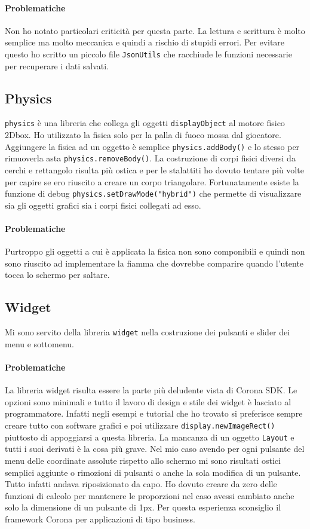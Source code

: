 		\paragraph{Problematiche}
			Non ho notato particolari criticità per questa parte. La lettura e scrittura è molto semplice ma molto meccanica e quindi a rischio di stupidi errori. Per evitare questo ho scritto un piccolo file \verb|JsonUtils| che racchiude le funzioni necessarie per recuperare i dati salvati.
		
	\subsection{Physics}
		\verb|physics| è una libreria che collega gli oggetti \verb|displayObject| al motore fisico 2Dbox. Ho utilizzato la fisica solo per la palla di fuoco mossa dal giocatore. Aggiungere la fisica ad un oggetto è semplice \verb|physics.addBody()| e lo stesso per rimuoverla asta \verb|physics.removeBody()|. La costruzione di corpi fisici diversi da cerchi e rettangolo risulta più ostica e per le stalattiti ho dovuto tentare più volte per capire se ero riuscito a creare un corpo triangolare. Fortunatamente esiste la funzione di debug \verb|physics.setDrawMode("hybrid")| che permette di visualizzare sia gli oggetti grafici sia i corpi fisici collegati ad esso.
		
		\paragraph{Problematiche}
		Purtroppo gli oggetti a cui è applicata la fisica non sono componibili e quindi non sono riuscito ad implementare la fiamma che dovrebbe comparire quando l'utente 
		tocca lo schermo per saltare.
		
	\subsection{Widget}
		Mi sono servito della libreria \verb|widget| nella costruzione dei pulsanti e slider dei menu e sottomenu. 
	
		\paragraph{Problematiche}
		La libreria widget risulta essere la parte più deludente vista di Corona SDK. Le opzioni sono minimali e tutto il lavoro di design e stile dei widget è lasciato al programmatore. Infatti negli esempi e tutorial che ho trovato si preferisce sempre creare tutto con software grafici e poi utilizzare \verb|display.newImageRect()| piuttosto di appoggiarsi a questa libreria. La mancanza di un oggetto \verb|Layout| e tutti i suoi derivati è la cosa più grave. Nel mio caso avendo per ogni pulsante del menu delle coordinate assolute rispetto allo schermo mi sono risultati ostici semplici aggiunte o rimozioni di pulsanti o anche la sola modifica di un pulsante. Tutto infatti andava riposizionato da capo. Ho dovuto creare da zero delle funzioni di calcolo per mantenere le proporzioni nel caso avessi cambiato anche solo la dimensione di un pulsante di 1px. 
		Per questa esperienza sconsiglio il framework Corona per applicazioni di tipo business.
	
